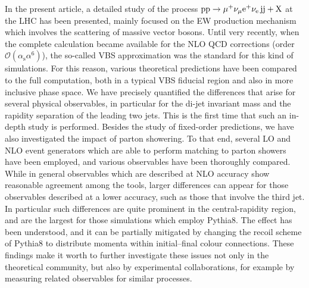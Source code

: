 \documentclass[twocolumn,epjc3]{svjour3} %
\newcommand{\Pj}{\ensuremath{\text{j}}\xspace}
\newcommand{\Pp}{\ensuremath{\text{p}}\xspace}
\newcommand{\alphas}{\ensuremath{\alpha_\text{s}}\xspace}
\begin{document}
In the present article, a detailed study of the process $\Pp\Pp\to\mu^+\nu_\mu{\rm e}^+\nu_{\rm e}\,\Pj\Pj+\mathrm{X}$ at the LHC has been presented, 
mainly focused on the EW production mechanism which involves the scattering of massive vector bosons.
Until very recently, when the complete calculation became available for the NLO QCD corrections (order $\mathcal O (\alphas\alpha^6)$),
the so-called VBS approximation was the standard for this kind of simulations. For this reason, various theoretical predictions 
have been compared to the full computation, both in a typical VBS fiducial region and also in more inclusive phase space.
We have precisely quantified the differences that arise for several physical observables, 
in particular for the di-jet invariant mass and the rapidity separation of the leading two jets.
This is the first time that such an in-depth study is performed.
Besides the study of fixed-order predictions, we have also investigated the impact of parton showering.
To that end, several LO and NLO event generators 
which are able to perform matching to parton showers have been employed, and various observables have been thoroughly compared.
While in general observables which are described at NLO accuracy show reasonable agreement among the tools, larger differences can 
appear for those observables described at a lower accuracy, such as those that involve the third jet.
In particular such differences are quite prominent in the central-rapidity region, and are the largest for those simulations which employ {\sc Pythia8}.
The effect
has been understood, and it can be partially mitigated by changing the recoil scheme of {\sc Pythia8} to distribute momenta within initial--final colour connections. These findings make it worth 
to further investigate these issues not only in the theoretical community, but also by experimental collaborations, for example by 
measuring related observables for similar processes.
\end{document}
